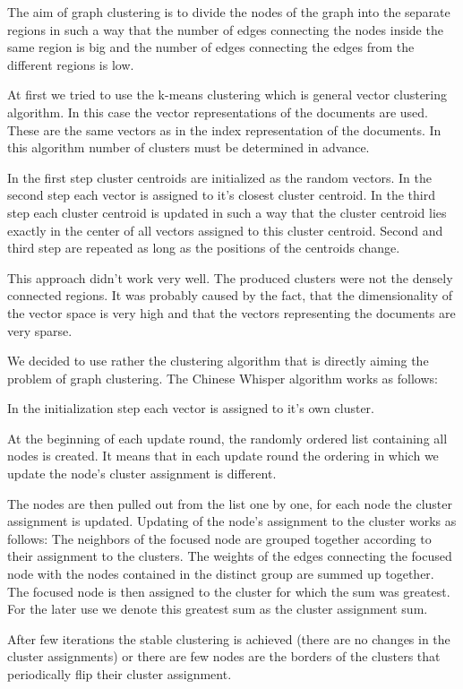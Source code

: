 The aim of graph clustering is to divide the nodes of the graph into the separate regions in such a way that the number of edges connecting the nodes inside the same region is big and the number of edges connecting the edges from the different regions is low.

At first we tried to use the k-means clustering which is general vector clustering algorithm. In this case the vector representations of the documents are used. These are the same vectors as in the index representation of the documents. In this algorithm number of clusters must be determined in advance. 

In the first step cluster centroids are initialized as the random vectors. 
In the second step each vector is assigned to it's closest cluster centroid.
In the third step each cluster centroid is updated in such a way that the cluster centroid lies exactly in the center of all vectors assigned to this cluster centroid.
Second and third step are repeated as long as the positions of the centroids change.
 
This approach didn't work very well. The produced clusters were not the densely connected regions. It was probably caused by the fact, that the dimensionality of the vector space is very high and that the vectors representing the documents are very sparse.


We decided to use rather the clustering algorithm that is directly aiming the problem of graph clustering.
The Chinese Whisper algorithm works as follows:

In the initialization step each vector is assigned to it's own cluster.

At the beginning of each update round, the randomly ordered list containing all nodes is created. It means that in each update round the ordering in which we update the node's cluster assignment is different.

The nodes are then pulled out from the list one by one, for each node the cluster assignment is updated. Updating of the node's assignment to the cluster works as follows: The neighbors of the focused node are grouped together according to their assignment to the clusters. The weights of the edges connecting the focused node with the nodes contained in the distinct group are summed up together. The focused node is then assigned to the cluster for which the sum was greatest. For the later use we denote this greatest sum as the cluster assignment sum.

After few iterations the stable clustering is achieved (there are no changes in the cluster assignments) or there are few nodes are the borders of the clusters that periodically flip their cluster assignment.


